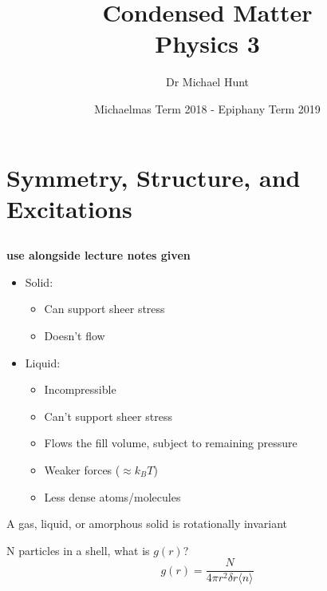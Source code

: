 \documentclass[a4paper, 11pt, normalem]{report}
\title{Condensed Matter \\ Physics 3 \vspace{-20pt}}
\author{Dr Michael Hunt}
\date{\vspace{-15pt}Michaelmas Term 2018 - Epiphany Term 2019}
\begin{document}
\maketitle
\tableofcontents

\part{Symmetry, Structure, and Excitations}
\chapter{}
\textbf{use alongside lecture notes given}

\begin{itemize}
    \item Solid:
        \begin{itemize}
            \item Can support sheer stress
            \item Doesn't flow
        \end{itemize}

    \item Liquid:
        \begin{itemize}
            \item Incompressible
            \item Can't support sheer stress
            \item Flows the fill volume, subject to remaining pressure
            \item Weaker forces ($\approx k_B T$)
            \item Less dense atoms/molecules
        \end{itemize}
\end{itemize}

A gas, liquid, or amorphous solid is rotationally invariant

N particles in a shell, what is $g(r)$?
\begin{equation}
    g(r) = \frac{N}{4\pi r^2\delta r\langle n\rangle}
\end{equation}
\end{document}
